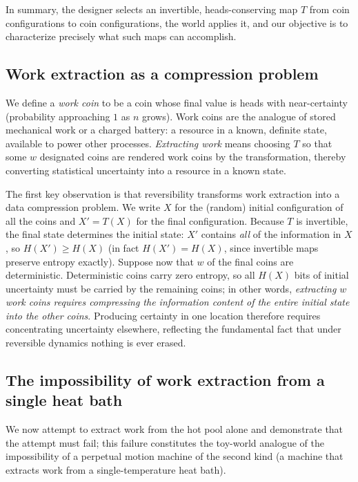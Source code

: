 \documentclass[10pt]{article}
\theoremstyle{definition}
\theoremstyle{remark}
\begin{document}
In summary, the designer selects an invertible, heads-conserving map $T$ from coin configurations to coin configurations, the world applies it, and our objective is to characterize precisely what such maps can accomplish.

\subsection{Work extraction as a compression problem}
\label{sec:workcompression}

We define a \emph{work coin} to be a coin whose final value is heads with near-certainty (probability approaching $1$ as $n$ grows). Work coins are the analogue of stored mechanical work or a charged battery: a resource in a known, definite state, available to power other processes. \emph{Extracting work} means choosing $T$ so that some $w$ designated coins are rendered work coins by the transformation, thereby converting statistical uncertainty into a resource in a known state.

The first key observation is that reversibility transforms work extraction into a data compression problem. We write $X$ for the (random) initial configuration of all the coins and $X' = T(X)$ for the final configuration. Because $T$ is invertible, the final state determines the initial state: $X'$ contains \emph{all} of the information in $X$, so $H(X') \ge H(X)$ (in fact $H(X') = H(X)$, since invertible maps preserve entropy exactly). Suppose now that $w$ of the final coins are deterministic. Deterministic coins carry zero entropy, so all $H(X)$ bits of initial uncertainty must be carried by the remaining coins; in other words, \emph{extracting $w$ work coins requires compressing the information content of the entire initial state into the other coins}. Producing certainty in one location therefore requires concentrating uncertainty elsewhere, reflecting the fundamental fact that under reversible dynamics nothing is ever erased.

\subsection{The impossibility of work extraction from a single heat bath}
\label{sec:onebath}

We now attempt to extract work from the hot pool alone and demonstrate that the attempt must fail; this failure constitutes the toy-world analogue of the impossibility of a perpetual motion machine of the second kind (a machine that extracts work from a single-temperature heat bath).
\end{document}
